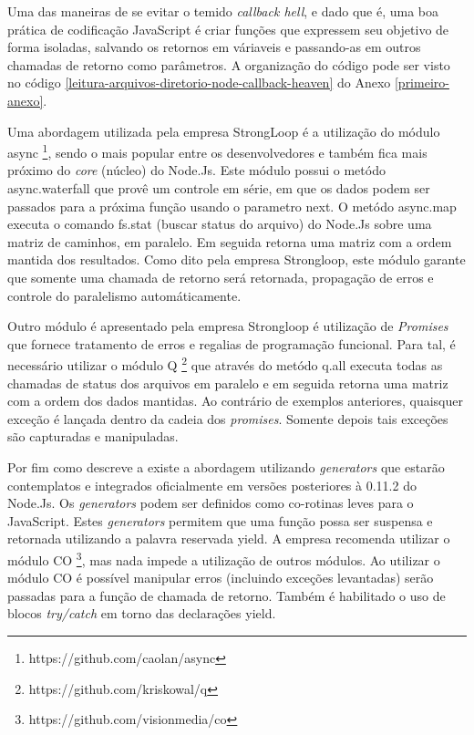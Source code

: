   Uma das maneiras de se evitar o temido \textit{callback hell}, e dado que é, uma boa prática de codificação JavaScript é
  criar funções que expressem seu objetivo de forma isoladas, salvando os retornos em váriaveis e passando-as em outros
  chamadas de retorno como parâmetros. A organização do código pode ser visto no código \ref{leitura-arquivos-diretorio-node-callback-heaven} do
  Anexo \ref{primeiro-anexo}.\cite{Pereira:2013}
 
  Uma abordagem utilizada pela empresa StrongLoop é a utilização do módulo async \footnote{https://github.com/caolan/async},
  sendo o mais popular entre os desenvolvedores e também fica mais próximo do \textit{core} (núcleo) do Node.Js. Este módulo
  possui o metódo async.waterfall que provê um controle em série, em que os dados podem ser passados para a próxima função
  usando o parametro next. O metódo async.map executa o comando fs.stat (buscar status do arquivo) do Node.Js sobre uma matriz
  de caminhos, em paralelo. Em seguida retorna uma matriz com a ordem mantida dos resultados. Como dito pela empresa
  Strongloop, este módulo garante que somente uma chamada de retorno será retornada, propagação de erros e controle do 
  paralelismo automáticamente. 
  
  Outro módulo é apresentado pela empresa Strongloop é utilização de \textit{Promises} que fornece tratamento de erros
  e regalias de programação funcional. Para tal, é necessário utilizar o módulo Q \footnote{https://github.com/kriskowal/q}
  que através do metódo q.all executa todas as chamadas de status dos arquivos em paralelo e em seguida retorna uma matriz
  com a ordem dos dados mantidas. Ao contrário de exemplos anteriores, quaisquer exceção é lançada dentro da cadeia dos
  \textit{promises}. Somente depois tais exceções são capturadas e manipuladas.
  
  Por fim como descreve a  existe a abordagem utilizando \textit{generators} que estarão
  contemplatos e integrados oficialmente em versões posteriores à 0.11.2 do Node.Js. Os \textit{generators} podem ser definidos
  como co-rotinas leves para o JavaScript. Estes \textit{generators} permitem que uma função possa ser suspensa e retornada
  utilizando a palavra reservada yield. A empresa recomenda utilizar o módulo CO \footnote{https://github.com/visionmedia/co},
  mas nada impede a utilização de outros módulos. Ao utilizar o módulo CO é possível manipular erros (incluindo exceções levantadas)
  serão passadas para a função de chamada de retorno. Também é habilitado o uso de blocos \textit{try/catch} em torno das 
  declarações yield.
  
